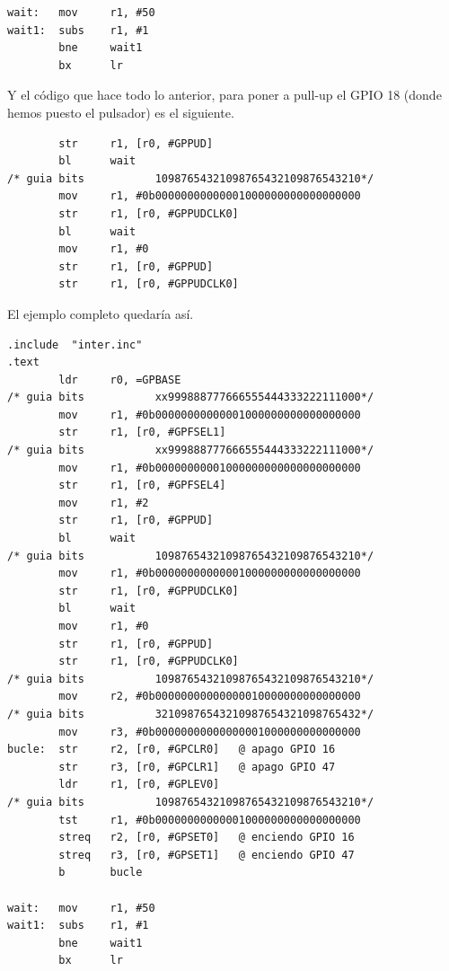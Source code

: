 \begin{lstlisting}
wait:   mov     r1, #50
wait1:  subs    r1, #1
        bne     wait1
        bx      lr
\end{lstlisting}

Y el código que hace todo lo anterior, para poner a pull-up el GPIO 18 (donde hemos puesto
el pulsador) es el siguiente.

\begin{lstlisting}
        str     r1, [r0, #GPPUD]
        bl      wait
/* guia bits           10987654321098765432109876543210*/
        mov     r1, #0b00000000000001000000000000000000
        str     r1, [r0, #GPPUDCLK0]
        bl      wait
        mov     r1, #0
        str     r1, [r0, #GPPUD]
        str     r1, [r0, #GPPUDCLK0]
\end{lstlisting}

El ejemplo completo quedaría así.

\begin{lstlisting}[caption={apend2.s},label={lst:codigoApendice_2}]
        .include  "inter.inc"
.text
        ldr     r0, =GPBASE
/* guia bits           xx999888777666555444333222111000*/
        mov     r1, #0b00000000000001000000000000000000
        str     r1, [r0, #GPFSEL1]
/* guia bits           xx999888777666555444333222111000*/
        mov     r1, #0b00000000001000000000000000000000
        str     r1, [r0, #GPFSEL4]
        mov     r1, #2
        str     r1, [r0, #GPPUD]
        bl      wait
/* guia bits           10987654321098765432109876543210*/
        mov     r1, #0b00000000000001000000000000000000
        str     r1, [r0, #GPPUDCLK0]
        bl      wait
        mov     r1, #0
        str     r1, [r0, #GPPUD]
        str     r1, [r0, #GPPUDCLK0]
/* guia bits           10987654321098765432109876543210*/
        mov     r2, #0b00000000000000010000000000000000
/* guia bits           32109876543210987654321098765432*/
        mov     r3, #0b00000000000000001000000000000000
bucle:  str     r2, [r0, #GPCLR0]   @ apago GPIO 16
        str     r3, [r0, #GPCLR1]   @ apago GPIO 47
        ldr     r1, [r0, #GPLEV0]
/* guia bits           10987654321098765432109876543210*/
        tst     r1, #0b00000000000001000000000000000000
        streq   r2, [r0, #GPSET0]   @ enciendo GPIO 16
        streq   r3, [r0, #GPSET1]   @ enciendo GPIO 47
        b       bucle

wait:   mov     r1, #50
wait1:  subs    r1, #1
        bne     wait1
        bx      lr
\end{lstlisting}

